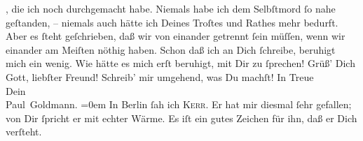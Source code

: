 \begin{ledgroupsized}[t]{13cm}
                  , die ich noch durchgemacht habe. Niemals
               habe ich dem Selbſtmord ſo nahe geſtanden, – niemals auch hätte ich Deines Troſtes
               und Rathes  mehr bedurft. Aber es ſteht geſchrieben, daß wir von einander getrennt ſein
               müſſen, wenn wir einander {\pb}am Meiſten nöthig haben.
               Schon daß ich an Dich ſchreibe, beruhigt mich ein wenig. Wie hätte es mich erſt
               beruhigt, mit Dir zu ſprechen!\pend
           \pstart
           Grüß’ Dich Gott, liebſter Freund! Schreib’ mir umgehend, was Du machſt!\pend
           \pstart
           In Treue {\\[\baselineskip]}Dein {\\[\baselineskip]}\spacefill\mbox{Paul Goldmann.}\pend
           \leftskip=0em{}\pstart
           \noindent{}In Berlin ſah ich \textsc{Kerr}. Er hat mir diesmal ſehr gefallen; von Dir ſpricht er mit echter Wärme. Es
                  iſt ein gutes Zeichen für ihn, daß er Dich verſteht.\pend
           
         
         \endnumbering{}\end{ledgroupsized}  \newcommand{\dateiname}{L02875}\newcommand{\titel}{Paul Goldmann an Arthur Schnitzler, 20. 5. [1899]}\newcommand{\editorInnen}{Martin Anton Müller und Laura Untner}
      